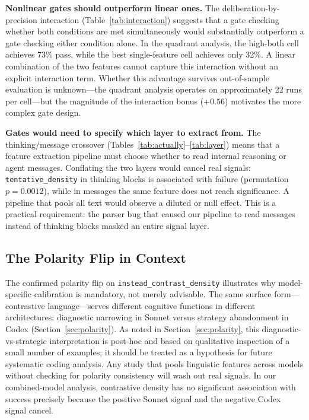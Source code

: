 \documentclass[11pt]{article}
\newcommand{\feat}[1]{\texttt{#1}}
\begin{document}
\textbf{Nonlinear gates should outperform linear ones.}
The deliberation-by-precision interaction (Table~\ref{tab:interaction}) suggests that a gate checking whether both conditions are met simultaneously would substantially outperform a gate checking either condition alone.
In the quadrant analysis, the high-both cell achieves 73\% pass, while the best single-feature cell achieves only 32\%.
A linear combination of the two features cannot capture this interaction without an explicit interaction term.
Whether this advantage survives out-of-sample evaluation is unknown---the quadrant analysis operates on approximately 22 runs per cell---but the magnitude of the interaction bonus ($+0.56$) motivates the more complex gate design.

\textbf{Gates would need to specify which layer to extract from.}
The thinking/message crossover (Tables~\ref{tab:actually}--\ref{tab:layer}) means that a feature extraction pipeline must choose whether to read internal reasoning or agent messages.
Conflating the two layers would cancel real signals: \feat{tentative\_density} in thinking blocks is associated with failure (permutation $p = 0.0012$), while in messages the same feature does not reach significance.
A pipeline that pools all text would observe a diluted or null effect.
This is a practical requirement: the parser bug that caused our pipeline to read messages instead of thinking blocks masked an entire signal layer.

\subsection{The Polarity Flip in Context}

The confirmed polarity flip on \feat{instead\_contrast\_density} illustrates why model-specific calibration is mandatory, not merely advisable.
The same surface form---contrastive language---serves different cognitive functions in different architectures: diagnostic narrowing in Sonnet versus strategy abandonment in Codex (Section~\ref{sec:polarity}).
As noted in Section~\ref{sec:polarity}, this diagnostic-vs-strategic interpretation is post-hoc and based on qualitative inspection of a small number of examples; it should be treated as a hypothesis for future systematic coding analysis.
Any study that pools linguistic features across models without checking for polarity consistency will wash out real signals.
In our combined-model analysis, contrastive density has no significant association with success precisely because the positive Sonnet signal and the negative Codex signal cancel.
\end{document}
